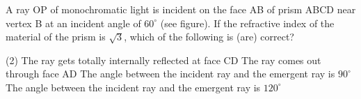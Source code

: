 
\item A ray OP of monochromatic light is incident on the face AB of prism ABCD near vertex B at an incident angle of \(60^\circ\) (see figure). If the refractive index of the material of the prism is \(\sqrt{3}\), which of the following is (are) correct?
    \begin{center}
    \end{center}
    \begin{tasks}(2)
        \task The ray gets totally internally reflected at face CD
        \task The ray comes out through face AD
        \task The angle between the incident ray and the emergent ray is \(90^\circ\)
        \task The angle between the incident ray and the emergent ray is \(120^\circ\)
    \end{tasks}
